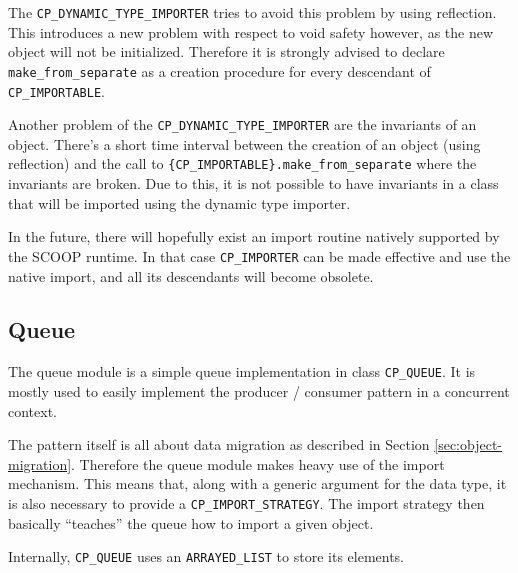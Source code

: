 The \lstinline!CP_DYNAMIC_TYPE_IMPORTER! tries to avoid this problem by using reflection.
This introduces a new problem with respect to void safety however, as the new object will not be initialized.
Therefore it is strongly advised to declare \lstinline!make_from_separate! as a creation procedure for every descendant of \lstinline!CP_IMPORTABLE!.

Another problem of the \lstinline!CP_DYNAMIC_TYPE_IMPORTER! are the invariants of an object.
There's a short time interval between the creation of an object (using reflection) and the call to \lstinline!{CP_IMPORTABLE}.make_from_separate! where the invariants are broken.
Due to this, it is not possible to have invariants in a class that will be imported using the dynamic type importer.

In the future, there will hopefully exist an import routine natively supported by the SCOOP runtime.
In that case \lstinline!CP_IMPORTER! can be made effective and use the native import, and all its descendants will become obsolete.



\subsection{Queue}

The queue module is a simple queue implementation in class \lstinline!CP_QUEUE!.
It is mostly used to easily implement the producer / consumer pattern in a concurrent context.


The pattern itself is all about data migration as described in Section \ref{sec:object-migration}.
Therefore the queue module makes heavy use of the import mechanism.
This means that, along with a generic argument for the data type, it is also necessary to provide a \lstinline!CP_IMPORT_STRATEGY!.
The import strategy then basically ``teaches'' the queue how to import a given object.

Internally, \lstinline!CP_QUEUE! uses an \lstinline!ARRAYED_LIST! to store its elements.

